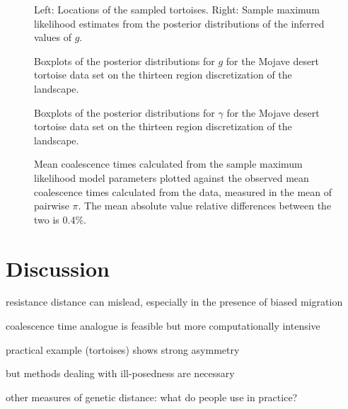 \documentclass{article}
\begin{document}
\begin{figure}
\centering
\caption{Left: Locations of the sampled tortoises.
Right: Sample maximum likelihood estimates from the posterior distributions of the inferred values of $g$.}
\label{fig:tort_land}
\end{figure}


\begin{figure}
\centering
\caption{Boxplots of the posterior distributions for $g$ 
for the Mojave desert tortoise data set 
on the thirteen region discretization of the landscape.}
\label{fig:tort_post_g}
\end{figure}

\begin{figure}
\centering
\caption{Boxplots of the posterior distributions for $\gamma$ 
for the Mojave desert tortoise data set 
on the thirteen region discretization of the landscape.}
\label{fig:tort_post_gam}
\end{figure}

\begin{figure}
\centering
\caption{Mean coalescence times calculated from the sample maximum likelihood model parameters 
plotted against the observed mean coalescence times calculated from the data, 
measured in the mean of pairwise $\pi$.
The mean absolute value relative differences between the two is 0.4\%.}
\label{fig:tort_h_comp}
\end{figure}


\section*{Discussion}

resistance distance can mislead, especially in the presence of biased migration

coalescence time analogue is feasible but more computationally intensive

practical example (tortoises) shows strong asymmetry

but methods dealing with ill-posedness are necessary

other measures of genetic distance: what do people use in practice?
\end{document}
